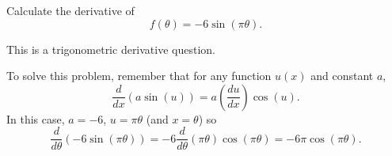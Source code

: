 \documentclass{ximera}
\author{Emma Smith Zbarsky}
\begin{document}
\begin{exercise}

Calculate the derivative of \[f(\theta) = -6\sin(\pi \theta).\]


\begin{hint}
This is a trigonometric derivative question.
\end{hint}


\begin{hint}
To solve this problem, remember that for any function $u(x)$ and
constant $a$,
\[\frac{d}{dx}\left(a\sin(u)\right) = a\left(\frac{du}{dx}\right)\cos(u).\]
In this case, $a = -6$, $u = \pi \theta$ (and $x=\theta$) so
\[\frac{d}{d\theta}\left(-6\sin(\pi \theta)\right) = -6\frac{d}{d\theta}\left(\pi\theta\right)\cos(\pi\theta) = -6\pi\cos(\pi\theta).\]
\end{hint}


\begin{multipleChoice}
\end{multipleChoice}

\end{exercise}
\end{document}
